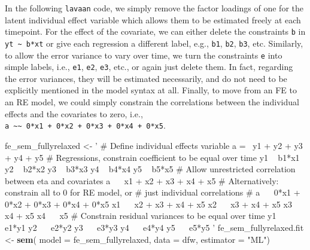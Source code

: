 \documentclass[]{interact}
\theoremstyle{plain}%
\theoremstyle{definition}
\theoremstyle{remark}
\newenvironment{Shaded}{\begin{snugshade}}{\end{snugshade}}
\newcommand{\DataTypeTok}[1]{\textcolor[rgb]{0.13,0.29,0.53}{#1}}
\newcommand{\KeywordTok}[1]{\textcolor[rgb]{0.13,0.29,0.53}{\textbf{#1}}}
\newcommand{\NormalTok}[1]{#1}
\newcommand{\StringTok}[1]{\textcolor[rgb]{0.31,0.60,0.02}{#1}}
\begin{document}
In the following \texttt{lavaan} code, we simply remove the factor
loadings of one for the latent individual effect variable which allows
them to be estimated freely at each timepoint. For the effect of the
covariate, we can either delete the constraints \texttt{b} in
\texttt{yt\ \textasciitilde{}\ b*xt} or give each regression a different
label, e.g., \texttt{b1}, \texttt{b2}, \texttt{b3}, etc. Similarly, to
allow the error variance to vary over time, we turn the constraints
\texttt{e} into simple labels, i.e., \texttt{e1}, \texttt{e2},
\texttt{e3}, etc., or again just delete them. In fact, regarding the
error variances, they will be estimated necessarily, and do not need to
be explicitly mentioned in the model syntax at all. Finally, to move
from an FE to an RE model, we could simply constrain the correlations
between the individual effects and the covariates to zero, i.e.,
\texttt{a\ \textasciitilde{}\textasciitilde{}\ 0*x1\ +\ 0*x2\ +\ 0*x3\ +\ 0*x4\ +\ 0*x5}.

\singlespacing

\begin{Shaded}
\begin{Highlighting}[]
\NormalTok{fe_sem_fullyrelaxed <-}\StringTok{ '}
\StringTok{# Define individual effects variable }
\StringTok{a =~ y1 + y2 + y3 + y4 + y5}
\StringTok{# Regressions, constrain coefficient to be equal over time}
\StringTok{y1 ~ b1*x1}
\StringTok{y2 ~ b2*x2 }
\StringTok{y3 ~ b3*x3}
\StringTok{y4 ~ b4*x4}
\StringTok{y5 ~ b5*x5}
\StringTok{# Allow unrestricted correlation between eta and covariates}
\StringTok{a ~~ x1 + x2 + x3 + x4 + x5}
\StringTok{# Alternatively: constrain all to 0 for RE model, or}
\StringTok{# just individual correlations}
\StringTok{# a ~~ 0*x1 + 0*x2 + 0*x3 + 0*x4 + 0*x5}
\StringTok{x1 ~~ x2 + x3 + x4 + x5}
\StringTok{x2 ~~ x3 + x4 + x5}
\StringTok{x3 ~~ x4 + x5}
\StringTok{x4 ~~ x5}
\StringTok{# Constrain residual variances to be equal over time}
\StringTok{y1 ~~ e1*y1}
\StringTok{y2 ~~ e2*y2}
\StringTok{y3 ~~ e3*y3}
\StringTok{y4 ~~ e4*y4}
\StringTok{y5 ~~ e5*y5}
\StringTok{'}
\NormalTok{fe_sem_fullyrelaxed.fit <-}\StringTok{ }\KeywordTok{sem}\NormalTok{( }\DataTypeTok{model =}\NormalTok{ fe_sem_fullyrelaxed, }
                                \DataTypeTok{data =}\NormalTok{ dfw, }
                                \DataTypeTok{estimator =} \StringTok{"ML"}\NormalTok{)}
\end{Highlighting}
\end{Shaded}

\doublespacing
\end{document}
